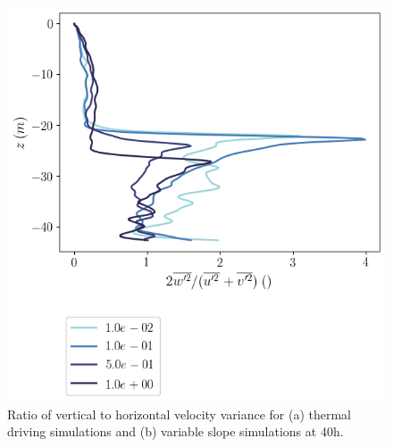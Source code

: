 \documentclass[draft,jgrga]{agutexSI2019}
\begin{document}
\begin{figure}[]
\begin{minipage}{0.5\textwidth}
        \includegraphics[trim={0 4cm 0 0},clip,width=\textwidth]{Figures/vel_var_ratio_cmp_dslope_40hr_tav1_z_profile.png}
    \end{minipage}
    \caption{Ratio of vertical to horizontal velocity variance for (a) thermal driving simulations and (b) variable slope simulations at 40h.}
    \label{fig:vel_var_ratio}
\end{figure}
\end{document}
